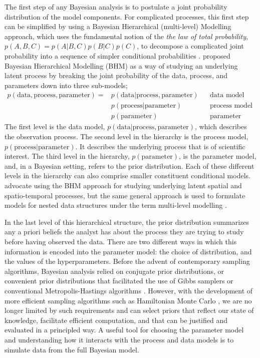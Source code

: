The first step of any Bayesian analysis is to postulate a joint probability distribution of the model components. For complicated processes, this first step can be simplified by using a Bayesian Hierarchical (multi-level) Modelling approach, which uses the fundamental notion of the \textit{the law of total probability}, $p(A, B, C) = p(A|B, C) p(B|C) p(C)$, to decompose a complicated joint probability into a sequence of simpler conditional probabilities \citep[p.~13]{wikle_2019}. \citet{Berliner_1996} proposed Bayesian Hierarchical Modelling (BHM) as a way of studying an underlying latent process by breaking the joint probability of the data, process, and parameters down into three sub-models;
\begin{align*}
 p(\text{data}, \text{process}, \text{parameter}) = & p(\text{data}| \text{process}, \text{parameter}) && \text{data model} \\
  & p(\text{process}| \text{parameter}) && \text{process model} \\
  & p(\text{parameter}) && \text{parameter model}
\end{align*}
The first level is the data model, $p(\text{data} | \text{process}, \text{parameter})$, which describes the observation process. The second level in the hierarchy is the process model, $p(\mbox{process} | \text{parameter})$. It describes the underlying process that is of scientific interest. The third level in the hierarchy, $p(\text{parameter})$, is the parameter model, and, in a Bayesian setting, refers to the prior distribution. Each of these different levels in the hierarchy can also comprise smaller constituent conditional models. \citet{cressie_2011} advocate using the BHM approach for studying underlying latent spatial and spatio-temporal processes, but the same general approach is used to formulate models for nested data structures under the term multi-level modelling \citep{BDA2020}. 

In the last level of this hierarchical structure, the prior distribution summarizes any a priori beliefs the analyst has about the process they are trying to study before having observed the data. There are two different ways in which this information is encoded into the parameter model: the choice of distribution, and the values of the hyperparameters. Before the advent of contemporary sampling algorithms, Bayesian analysis relied on conjugate prior distributions, or convenient prior distributions that facilitated the use of Gibbs samplers or conventional Metropolis-Hastings algorithms \citep{gilks_1996}. However, with the development of more efficient sampling algorithms such as Hamiltonian Monte Carlo \citep{betancourt_2017}, we are no longer limited by such requirements and can select priors that reflect our state of knowledge, facilitate efficient computation, and that can be justified and evaluated in a principled way. A useful tool for choosing the parameter model and understanding how it interacts with the process and data models is to simulate data from the full Bayesian model.


